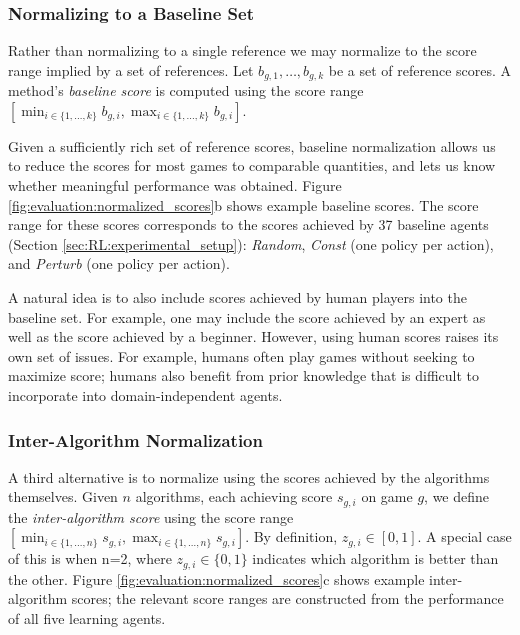 \documentclass[twoside,11pt]{article}
\begin{document}
\subsubsection{Normalizing to a Baseline Set}

Rather than normalizing to a single reference we may normalize to the score range implied by
a set of references. Let $b_{g,1}, \dots, b_{g,k}$ be a set of reference scores. A 
method's \emph{baseline score} is computed using the score range 
$[ \min_{i \in \{ 1, \dots, k \} } b_{g,i}, \max_{i \in \{1, \dots, k\}} b_{g,i} ]$.



Given a sufficiently rich set of reference scores, baseline normalization allows us to reduce the scores for most games to comparable quantities, and lets us know whether meaningful performance was obtained. 
Figure \ref{fig:evaluation:normalized_scores}b shows example baseline scores. The score range for these scores corresponds to the scores achieved by 37 baseline agents (Section \ref{sec:RL:experimental_setup}): \emph{Random}, \emph{Const} (one policy per action), and \emph{Perturb} (one policy per action). 

A natural idea is to also include scores achieved by human players into the baseline set. 
For example, one may include the score achieved by an expert as well as the score achieved by a beginner. However, using human scores raises its own set of issues. 
For example, humans often play games without seeking to maximize score; humans also benefit from prior knowledge that is difficult to incorporate into domain-independent agents.

\subsubsection{Inter-Algorithm Normalization} 


A third alternative is to normalize using the scores achieved by the algorithms themselves. 
Given $n$ algorithms, each achieving score $s_{g,i}$ on game $g$, we define the 
\emph{inter-algorithm score} using the score range 
$[ \min_{i \in \{ 1, \dots, n \} } s_{g,i}, \max_{i \in \{1, \dots, n\}} s_{g,i} ]$.
By definition, $z_{g,i} \in [0, 1]$. A special case of this is when n=2, where 
$z_{g,i} \in \{0, 1\}$ indicates which algorithm is better than the other.
Figure \ref{fig:evaluation:normalized_scores}c shows example inter-algorithm scores; the 
relevant score ranges are constructed from the performance of all five learning agents. 
\end{document}
